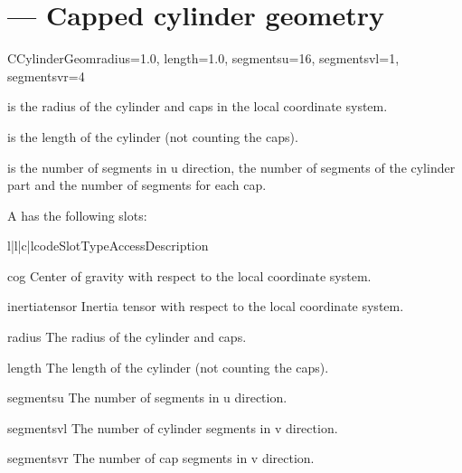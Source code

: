 
\section{ ---
         Capped cylinder geometry}

\begin{classdesc}{CCylinderGeom}{radius=1.0, length=1.0, segmentsu=16, segmentsvl=1, segmentsvr=4}

 is the radius of the cylinder and caps in the local coordinate 
system.

 is the length of the cylinder (not counting the caps).

 is the number of segments in u direction, 
the number of segments of the cylinder part and  the
number of segments for each cap.
\end{classdesc}

A  has the following slots:

\begin{tableiv}{l|l|c|l}{code}{Slot}{Type}{Access}{Description}
\end{tableiv}

\begin{memberdesc}{cog}
Center of gravity with respect to the local coordinate system.
\end{memberdesc}

\begin{memberdesc}{inertiatensor}
Inertia tensor with respect to the local coordinate system.
\end{memberdesc}

\begin{memberdesc}{radius}
The radius of the cylinder and caps.
\end{memberdesc}

\begin{memberdesc}{length}
The length of the cylinder (not counting the caps).
\end{memberdesc}

\begin{memberdesc}{segmentsu}
The number of segments in u direction.
\end{memberdesc}

\begin{memberdesc}{segmentsvl}
The number of cylinder segments in v direction.
\end{memberdesc}

\begin{memberdesc}{segmentsvr}
The number of cap segments in v direction.
\end{memberdesc}
